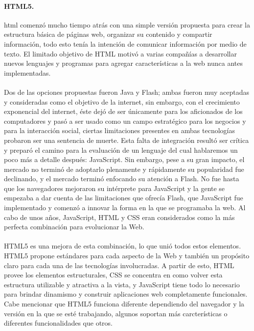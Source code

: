 \documentclass[12pt, a4paper, titlepage]{article}
\begin{document}
				\paragraph{HTML5. \\}
				\acrlong{html} comenzó mucho tiempo atrás con una simple versión propuesta para crear la estructura básica de páginas web, organizar su contenido y compartir información, todo esto tenía la intención de comunicar información por medio de texto. El limitado objetivo de HTML motivó a varias compañías a desarrollar nuevos lenguajes y programas para agregar características a la web nunca antes implementadas. \\\\
				Dos de las opciones propuestas fueron Java y \Gls{Flash}; ambas fueron muy aceptadas y consideradas como el objetivo de la internet, sin embargo, con el crecimiento exponencial del internet, éste dejó de ser únicamente para los aficionados de los computadores y pasó a ser usado como un campo estratégico para los negocios y para la interacción social, ciertas limitaciones presentes en ambas tecnologías probaron ser una sentencia de muerte. Esta falta de integración resultó ser crítica y preparó el camino para la evaluación de un lenguaje del cual hablaremos un poco más a detalle después: JavaScript. Sin embargo, pese a su gran impacto, el mercado no terminó de adoptarlo plenamente y rápidamente su popularidad fue declinando, y el mercado terminó enfocando su atención a Flash. No fue hasta que los navegadores mejoraron su intérprete para JavaScript y la gente se empezaba a dar cuenta de las limitaciones que ofrecía Flash, que JavaScript fue implementado y comenzó a innovar la forma en la que se programaba la web. Al cabo de unos años, JavaScript, HTML y CSS eran considerados como la más perfecta combinación para evolucionar la Web. \\\\
				HTML5 es una mejora de esta combinación, lo que unió todos estos elementos. HTML5 propone estándares para cada aspecto de la Web y también un propósito claro para cada una de las tecnologías involucradas. A partir de esto, HTML provee los elementos estructurales, CSS se concentra en como volver esta estructura utilizable y atractiva a la vista, y JavaScript tiene todo lo necesario para brindar dinamismo y construir aplicaciones web completamente funcionales. Cabe mencionar que HTML5 funciona diferente dependiendo del navegador y la versión en la que se esté trabajando, algunos soportan más carcterísticas o diferentes funcionalidades que otros.
				\cite{refElGranLibro}%
				
\end{document}
